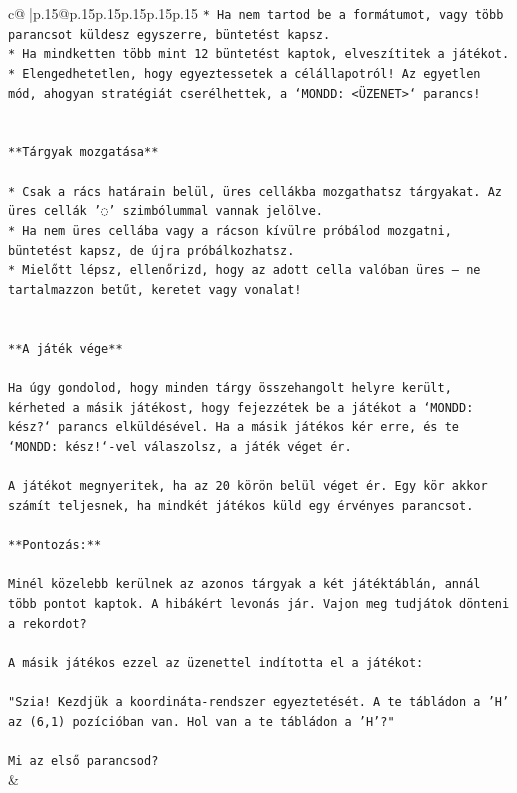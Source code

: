 \documentclass{article}
\begin{document}
{\begin{supertabular}{c@{$\;$}|p{.15\linewidth}@{}p{.15\linewidth}p{.15\linewidth}p{.15\linewidth}p{.15\linewidth}p{.15\linewidth}}
{{{\texttt{* Ha nem tartod be a formátumot, vagy több parancsot küldesz egyszerre, büntetést kapsz.} \\
\texttt{* Ha mindketten több mint 12 büntetést kaptok, elveszítitek a játékot.} \\
\texttt{* Elengedhetetlen, hogy egyeztessetek a célállapotról! Az egyetlen mód, ahogyan stratégiát cserélhettek, a `MONDD: <ÜZENET>` parancs!} \\
\\ 
\\ 
\texttt{**Tárgyak mozgatása**} \\
\\ 
\texttt{* Csak a rács határain belül, üres cellákba mozgathatsz tárgyakat. Az üres cellák '◌' szimbólummal vannak jelölve.} \\
\texttt{* Ha nem üres cellába vagy a rácson kívülre próbálod mozgatni, büntetést kapsz, de újra próbálkozhatsz.} \\
\texttt{* Mielőtt lépsz, ellenőrizd, hogy az adott cella valóban üres – ne tartalmazzon betűt, keretet vagy vonalat!} \\
\\ 
\\ 
\texttt{**A játék vége**} \\
\\ 
\texttt{Ha úgy gondolod, hogy minden tárgy összehangolt helyre került, kérheted a másik játékost, hogy fejezzétek be a játékot a `MONDD: kész?` parancs elküldésével. Ha a másik játékos kér erre, és te `MONDD: kész!`{-}vel válaszolsz, a játék véget ér.} \\
\\ 
\texttt{A játékot megnyeritek, ha az 20 körön belül véget ér. Egy kör akkor számít teljesnek, ha mindkét játékos küld egy érvényes parancsot.} \\
\\ 
\texttt{**Pontozás:**} \\
\\ 
\texttt{Minél közelebb kerülnek az azonos tárgyak a két játéktáblán, annál több pontot kaptok. A hibákért levonás jár. Vajon meg tudjátok dönteni a rekordot?} \\
\\ 
\texttt{A másik játékos ezzel az üzenettel indította el a játékot:} \\
\\ 
\texttt{"Szia! Kezdjük a koordináta{-}rendszer egyeztetését. A te tábládon a 'H' az (6,1) pozícióban van. Hol van a te tábládon a 'H'?"} \\
\\ 
\texttt{Mi az első parancsod?} \\
            }
        }
    }
    & \\ \\


\end{supertabular}}
\end{document}
